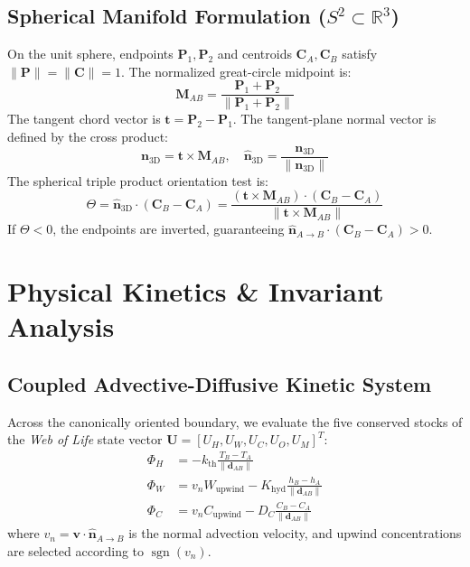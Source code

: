 \documentclass[10pt,twocolumn,a4paper]{article}
\begin{document}
\subsection{Spherical Manifold Formulation ($S^2 \subset \mathbb{R}^3$)}
On the unit sphere, endpoints $\mathbf{P}_1, \mathbf{P}_2$ and centroids $\mathbf{C}_A, \mathbf{C}_B$ satisfy $\|\mathbf{P}\| = \|\mathbf{C}\| = 1$. The normalized great-circle midpoint is:
\begin{equation}
\mathbf{M}_{AB} = \frac{\mathbf{P}_1 + \mathbf{P}_2}{\|\mathbf{P}_1 + \mathbf{P}_2\|}
\end{equation}
The tangent chord vector is $\mathbf{t} = \mathbf{P}_2 - \mathbf{P}_1$. The tangent-plane normal vector is defined by the cross product:
\begin{equation}
\mathbf{n}_{\text{3D}} = \mathbf{t} \times \mathbf{M}_{AB}, \quad \hat{\mathbf{n}}_{\text{3D}} = \frac{\mathbf{n}_{\text{3D}}}{\|\mathbf{n}_{\text{3D}}\|}
\end{equation}
The spherical triple product orientation test is:
\begin{equation}
\Theta = \hat{\mathbf{n}}_{\text{3D}} \cdot (\mathbf{C}_B - \mathbf{C}_A) = \frac{(\mathbf{t} \times \mathbf{M}_{AB}) \cdot (\mathbf{C}_B - \mathbf{C}_A)}{\|\mathbf{t} \times \mathbf{M}_{AB}\|}
\end{equation}
If $\Theta < 0$, the endpoints are inverted, guaranteeing $\hat{\mathbf{n}}_{A \to B} \cdot (\mathbf{C}_B - \mathbf{C}_A) > 0$.

\section{Physical Kinetics \& Invariant Analysis}

\subsection{Coupled Advective-Diffusive Kinetic System}
Across the canonically oriented boundary, we evaluate the five conserved stocks of the \textit{Web of Life} state vector $\mathbf{U} = [U_H, U_W, U_C, U_O, U_M]^T$:
\begin{align}
\Phi_H &= -k_{\text{th}} \frac{T_B - T_A}{\|\mathbf{d}_{AB}\|} \\
\Phi_W &= v_n W_{\text{upwind}} - K_{\text{hyd}} \frac{h_B - h_A}{\|\mathbf{d}_{AB}\|} \\
\Phi_C &= v_n C_{\text{upwind}} - D_C \frac{C_B - C_A}{\|\mathbf{d}_{AB}\|}
\end{align}
where $v_n = \mathbf{v} \cdot \hat{\mathbf{n}}_{A \to B}$ is the normal advection velocity, and upwind concentrations are selected according to $\operatorname{sgn}(v_n)$.
\end{document}

